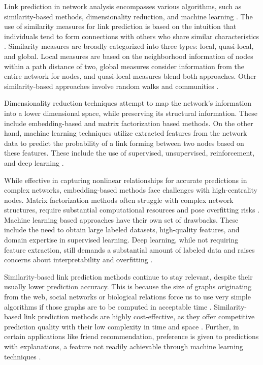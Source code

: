 Link prediction in network analysis encompasses various algorithms, such as similarity-based methods, dimensionality reduction, and machine learning \cite{arrar2023comprehensive}. The use of similarity measures for link prediction is based on the intuition that individuals tend to form connections with others who share similar characteristics \cite{wang2014link}. Similarity measures are broadly categorized into three types: local, quasi-local, and global. Local measures are based on the neighborhood information of nodes within a path distance of two, global measures consider information from the entire network for nodes, and quasi-local measures blend both approaches. Other similarity-based approaches involve random walks and communities \cite{arrar2023comprehensive}.

Dimensionality reduction techniques \cite{coskun2015link} attempt to map the network's information into a lower dimensional space, while preserving its structural information. These include embedding-based and matrix factorization based methods. On the other hand, machine learning techniques utilize extracted features from the network data to predict the probability of a link forming between two nodes based on these features. These include the use of supervised, unsupervised, reinforcement, and deep learning \cite{cui2018survey, arrar2023comprehensive}.

While effective in capturing nonlinear relationships for accurate predictions in complex networks, embedding-based methods face challenges with high-centrality nodes. Matrix factorization methods often struggle with complex network structures, require substantial computational resources and pose overfitting risks \cite{arrar2023comprehensive, martinez2016survey}. Machine learning based approaches have their own set of drawbacks. These include the need to obtain large labeled datasets, high-quality features, and domain expertise in supervised learning. Deep learning, while not requiring feature extraction, still demands a substantial amount of labeled data and raises concerns about interpretability and overfitting \cite{cui2018survey}.

Similarity-based link prediction methods continue to stay relevant, despite their usually lower prediction accuracy. This is because the size of graphs originating from the web, social networks or biological relations force us to use very simple algorithms if those graphs are to be computed in acceptable time \cite{garcia2014link}. Similarity-based link prediction methods are highly cost-effective, as they offer competitive prediction quality with their low complexity in time and space \cite{zhou2021progresses}. Further, in certain applications like friend recommendation, preference is given to predictions with explanations, a feature not readily achievable through machine learning techniques \cite{barbieri2014follow}.

